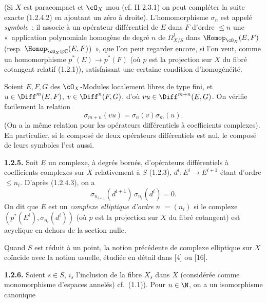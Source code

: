 (Si $X$ est
paracompact et $\cO_X$ mou (cf. II 2.3.1) on peut compléter la suite exacte (1.2.4.2) en ajoutant un zéro à droite). L'homomorphisme $\sigma_n$ est appelé \emph{symbole}~; il associe à un opérateur différentiel de $E$ dans $F$ d'ordre $\le n$ une «~application polynomiale homogène de degré $n$ de $\Omega^1_{X/S}$ dans $\Homop_{\cO_X}(E,F)$ (resp. $\Homop_{\cO_X\otimes\mathbb C}(E,F)$)~», que l'on peut regarder encore, si l'on veut, comme un homomorphisme $p^*(E)\longrightarrow p^*(F)$ (où $p$ est la projection sur $X$ du fibré cotangent relatif (1.2.1)), satisfaisant une certaine condition d'homogénéité.

Soient $E,F,G$ des $\cO_X$-Modules localement libres de type fini, et $u\in\Diff^m(E,F)$, $v\in\Diff^n(F,G)$, d'où $vu\in\Diff^{m+n}(E,G)$. On vérifie facilement la relation
\begin{equation}\tag{1.2.4.3}
  \sigma_{m+n}(vu)=\sigma_n(v)\sigma_m(u).
\end{equation}
(On a la même relation pour les opérateurs différentiels à coefficients complexes). En particulier, si le composé de deux opérateurs différentiels est nul, le composé de leurs symboles l'est aussi.

\textbf{1.2.5.} Soit $E$ un complexe, à degrés bornés, d'opérateurs différentiels à coefficients complexes sur $X$ relativement à $S$ (1.2.3), $d^i:E^i\longrightarrow E^{i+1}$ étant d'ordre $\le n_i$. D'après (1.2.4.3), on a
\[
  \sigma_{n_{i+1}}(d^{i+1})\,\sigma_{n_i}(d^i)=0.
\]
On dit que $E$ est un \emph{complexe elliptique d'ordre $n$} $=(n_i)$ si le complexe $(p^*(E^i),\sigma_{n_i}(d^i))$ (où $p$ est la projection sur $X$ du fibré cotangent) est acyclique en dehors de la section nulle.

Quand $S$ est réduit à un point, la notion précédente de complexe elliptique sur $X$ coïncide avec la notion usuelle, étudiée en détail dans [4] ou [16].

\textbf{1.2.6.} Soient $s\in S$, $i_s$ l'inclusion de la fibre $X_s$ dans $X$ (considérée comme monomorphisme d'espaces annelés) cf.~(1.1)). Pour $n\in\N$, on a un isomorphisme canonique

